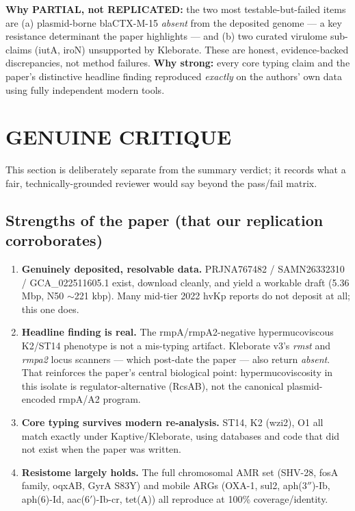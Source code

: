 \documentclass[11pt]{article}
\begin{document}
\textbf{Why PARTIAL, not REPLICATED:} the two most testable-but-failed items are (a) plasmid-borne blaCTX-M-15 \emph{absent} from the deposited genome --- a key resistance determinant the paper highlights --- and (b) two curated virulome sub-claims (iutA, iroN) unsupported by Kleborate. These are honest, evidence-backed discrepancies, not method failures. \textbf{Why strong:} every core typing claim and the paper's distinctive headline finding reproduced \emph{exactly} on the authors' own data using fully independent modern tools.

\section{GENUINE CRITIQUE}

This section is deliberately separate from the summary verdict; it records what a fair, technically-grounded reviewer would say beyond the pass/fail matrix.

\subsection{Strengths of the paper (that our replication corroborates)}
\begin{enumerate}[leftmargin=*]
\item \textbf{Genuinely deposited, resolvable data.} PRJNA767482 / SAMN26332310 / GCA\_022511605.1 exist, download cleanly, and yield a workable draft (5.36 Mbp, N50 $\sim$221 kbp). Many mid-tier 2022 hvKp reports do not deposit at all; this one does.
\item \textbf{Headline finding is real.} The rmpA/rmpA2-negative hypermucoviscous K2/ST14 phenotype is not a mis-typing artifact. Kleborate v3's \emph{rmst} and \emph{rmpa2} locus scanners --- which post-date the paper --- also return \emph{absent}. That reinforces the paper's central biological point: hypermucoviscosity in this isolate is regulator-alternative (RcsAB), not the canonical plasmid-encoded rmpA/A2 program.
\item \textbf{Core typing survives modern re-analysis.} ST14, K2 (wzi2), O1 all match exactly under Kaptive/Kleborate, using databases and code that did not exist when the paper was written.
\item \textbf{Resistome largely holds.} The full chromosomal AMR set (SHV-28, fosA family, oqxAB, GyrA S83Y) and mobile ARGs (OXA-1, sul2, aph(3$''$)-Ib, aph(6)-Id, aac(6$'$)-Ib-cr, tet(A)) all reproduce at 100\% coverage/identity.
\end{enumerate}
\end{document}
